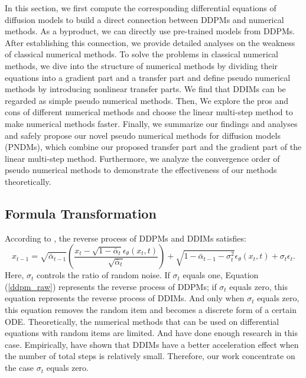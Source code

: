 \documentclass{article}
\begin{document}
In this section, we first compute the corresponding differential equations of diffusion models to build a direct connection between DDPMs and numerical methods. As a byproduct, we can directly use pre-trained models from DDPMs. After establishing this connection, we provide detailed analyses on the weakness of classical numerical methods. To solve the problems in classical numerical methods, we dive into the structure of numerical methods by dividing their equations into a gradient part and a transfer part and define pseudo numerical methods by introducing nonlinear transfer parts. We find that DDIMs can be regarded as simple pseudo numerical methods. Then, We explore the pros and cons of different numerical methods and choose the linear multi-step method to make numerical methods faster. Finally, we summarize our findings and analyses and safely propose our novel pseudo numerical methods for diffusion models (PNDMs), which combine our proposed transfer part and the gradient part of the linear multi-step method. Furthermore, we analyze the convergence order of pseudo numerical methods to demonstrate the effectiveness of our methods theoretically.



\subsection{Formula Transformation}
\label{formula_trans}
According to \citet{Song2020a}, the reverse process of DDPMs and DDIMs satisfies:
\begin{equation}
   x_{t-1} = \sqrt{\bar{\alpha}_{t-1}}\left(\frac{x_t-\sqrt{1-\bar{\alpha}_t}\epsilon_\theta(x_t, t)}{\sqrt{\bar{\alpha}_t}}\right) + \sqrt{1-\bar{\alpha}_{t-1}-\sigma^2_t}\epsilon_\theta(x_t, t) + \sigma_t \epsilon_t.
   \label{ddpm_raw}
\end{equation}
Here, $\sigma_t$ controls the ratio of random noise. If $\sigma_t$ equals one, Equation (\ref{ddpm_raw}) represents the reverse process of DDPMs; if $\sigma_t$ equals zero, this equation represents the reverse process of DDIMs. And only when $\sigma_t$ equals zero, this equation removes the random item and becomes a discrete form of a certain ODE. Theoretically, the numerical methods that can be used on differential equations with random items are limited. And \citet{Song2020} have done enough research in this case. Empirically, \citet{Song2020a} have shown that DDIMs have a better acceleration effect when the number of total steps is relatively small. Therefore, our work concentrate on the case $\sigma_t$ equals zero.
\end{document}
